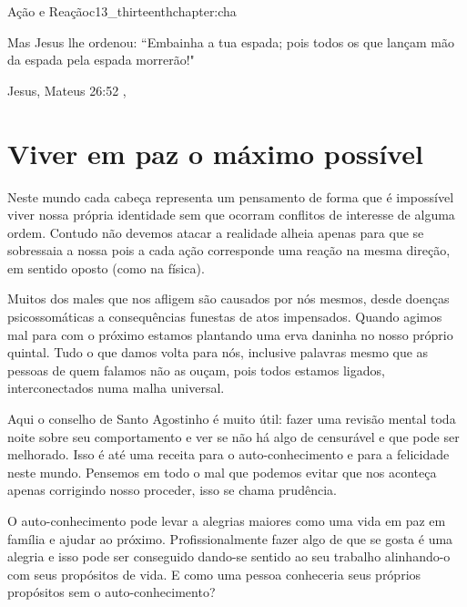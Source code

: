 \begin{chapterpage}{Ação e Reação}{c13_thirteenthchapter:cha}

\begin{myquotation} Mas Jesus lhe ordenou: ``Embainha a tua espada; pois todos os que lançam mão da espada pela espada morrerão!"
 

\par\vspace*{15mm}
\mbox{}\hfill \emdash{}Jesus, Mateus 26:52 
, %
\par\end{myquotation}

\end{chapterpage}



\section{Viver em paz o máximo possível}\label{c1_basicformatting:sec}

\emdash{}Neste mundo cada cabeça representa um pensamento de forma que é impossível viver nossa própria identidade sem que ocorram conflitos de interesse de alguma ordem. Contudo não devemos atacar a realidade alheia apenas para que se sobressaia a nossa pois a cada ação corresponde uma reação na mesma direção, em sentido oposto (como na física). 

\emdash{}Muitos dos males que nos afligem são causados por nós mesmos, desde doenças psicossomáticas a consequências funestas de atos impensados. Quando agimos mal para com o próximo estamos plantando uma erva daninha no nosso próprio quintal. Tudo o que damos volta para nós, inclusive palavras mesmo que as pessoas de quem falamos não as ouçam, pois todos estamos ligados, interconectados numa malha universal.

\emdash{}Aqui o conselho de Santo Agostinho é muito útil: fazer uma revisão mental toda noite sobre seu comportamento e ver se não há algo de censurável e que pode ser melhorado. Isso é até uma receita para o auto-conhecimento e para a felicidade neste mundo. Pensemos em todo o mal que podemos evitar que nos aconteça apenas corrigindo nosso proceder, isso se chama prudência.

\emdash{}O auto-conhecimento pode levar a alegrias maiores como uma vida em paz em família e ajudar ao próximo. Profissionalmente fazer algo de que se gosta é uma alegria e isso pode ser conseguido dando-se sentido ao seu trabalho alinhando-o com seus propósitos de vida. E como uma pessoa conheceria seus próprios propósitos sem o auto-conhecimento?

